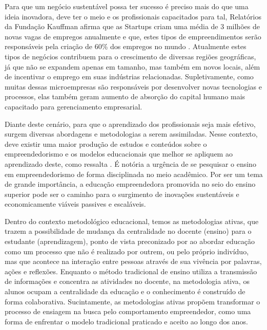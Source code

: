 Para que um negócio sustentável possa ter sucesso é preciso mais do que uma ideia inovadora, deve ter o meio e os profissionais capacitados para tal, Relatórios da Fundação Kauffman afirma que as Startups criam uma média de 3 milhões de novas vagas de empregos anualmente e que, estes tipos de empreendimentos serão responsáveis pela criação de 60\% dos empregos no  mundo  \cite{brasil_o_2017}. 
Atualmente estes tipos de  negócios contribuem para o crescimento de diversas regiões geográficas, já que não se expandem apenas em tamanho, mas também em novos locais, além de incentivar o emprego em suas indústrias relacionadas. Supletivamente, como muitas dessas microempresas são responsáveis por desenvolver novas tecnologias e processos, elas também geram aumento de absorção do capital humano mais capacitado para gerenciamento empresarial.

Diante deste cenário, para que o aprendizado dos profissionais seja mais efetivo, surgem diversas abordagens e metodologias a serem assimiladas. Nesse contexto, deve existir uma maior produção de estudos e conteúdos sobre o empreendedorismo e os modelos educacionais que melhor se apliquem ao aprendizado deste, como ressalta . É notória a urgência de se pesquisar o ensino em empreendedorismo de forma disciplinada no meio acadêmico. Por ser um tema de grande importância, a educação empreendedora promovida no seio do ensino superior pode ser o caminho para o surgimento de inovações sustentáveis e economicamente viáveis passives e escaláveis.

Dentro do contexto metodológico educacional, temos as metodologias ativas, que trazem a possibilidade de mudança da centralidade no docente (ensino) para o estudante (aprendizagem), ponto de vista preconizado por  ao abordar educação como um processo que não é realizado por outrem, ou pelo próprio indivíduo, mas que acontece na interação entre pessoas através de sua vivência por palavras, ações e reflexões. 
Enquanto o método tradicional de ensino utiliza a transmissão de informações e concentra as atividades no docente, na metodologia ativa, os alunos ocupam a centralidade da educação e o conhecimento é construído de forma colaborativa. Sucintamente, as metodologias ativas propõem transformar o processo de ensiagem na busca pelo comportamento empreendedor, como uma forma de enfrentar o modelo tradicional praticado e aceito ao longo dos anos.
 
